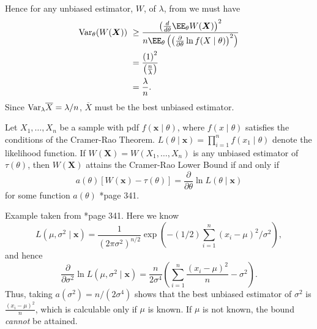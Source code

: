 \begin{exam}
\begin{align*}
    \end{align*}
    Hence for any unbiased estimator, $W$, of $\lambda$, from  we must have
    \begin{align*}
        \Var_{\theta} (W(\bm{X})) \
         & \geq \frac{\left( \frac{d}{d \theta} \EE_{\theta} W(\bm{X}) \right)^2}{n \EE_{\theta} \left( \left( \frac{\partial}{\partial \theta} \ln f(X \mid \theta)  \right)^2 \right)} \\
         & = \frac{\left( 1 \right)^2}{\left( \frac{n}{\lambda} \right)}                                                                                                                 \\
         & = \frac{\lambda}{n}.
    \end{align*}
    Since ${\operatorname{Var}}_{\lambda} \overline{X} = \lambda / n$, $\overline{X}$ must be the best unbiased estimator.
\end{exam}

\begin{cor}[Attainment] \label{cor: cri_attainment}
    Let $X_1 , \ldots , X_n$ be a sample with pdf $f(\bm{x} \mid \theta)$, where $f(x \mid \theta)$ satisfies the conditions of the Cramer-Rao Theorem. $L(\theta \mid \bm{x}) = \prod_{i=1}^{n} f(x_1 \mid \theta)$ denote the likelihood function. If $W(\bm{X}) = W(X_1 , \ldots , X_n)$ is any unbiased estimator of $\tau (\theta)$, then $W(\bm{X})$ attains the Cramer-Rao Lower Bound if and only if
    \begin{equation*}
        a(\theta) \left[ W(\bm{x}) - \tau (\theta) \right] = \frac{\partial}{\partial \theta} \ln L (\theta \mid \bm{x})
    \end{equation*}
    for some function $a(\theta)$ \cite{CasellaGeorge2001SI}*{page 341}.
\end{cor}

\begin{exam} \label{exam: exam: norm_mse_p2}
    Example taken from \cite{CasellaGeorge2001SI}*{page 341}. Here we know
    \begin{equation*}
        L(\mu , \sigma^2 \mid \bm{x}) = \frac{1}{(2 \pi \sigma^2)^{n/2}} \exp \left( -(1/2) \sum_{i=1}^{n} (x_i - \mu)^2 / \sigma^2 \right),
    \end{equation*}
    and hence
    \begin{equation*}
        \frac{\partial}{\partial \sigma^2} \ln L(\mu , \sigma^2 \mid \bm{x}) = \frac{n}{2 \sigma^4} \left( \sum_{i=1}^{n} \frac{(x_i - \mu)^2}{n} - \sigma^2 \right).
    \end{equation*}
    Thus, taking $a(\sigma^2) = n / (2 \sigma^4)$ shows that the best unbiased estimator of $\sigma^2$ is $\frac{(x_i - \mu)^2}{n}$, which is calculable only if $\mu$ is known. If $\mu$ is not known, the bound {\it cannot} be attained.
\end{exam}

